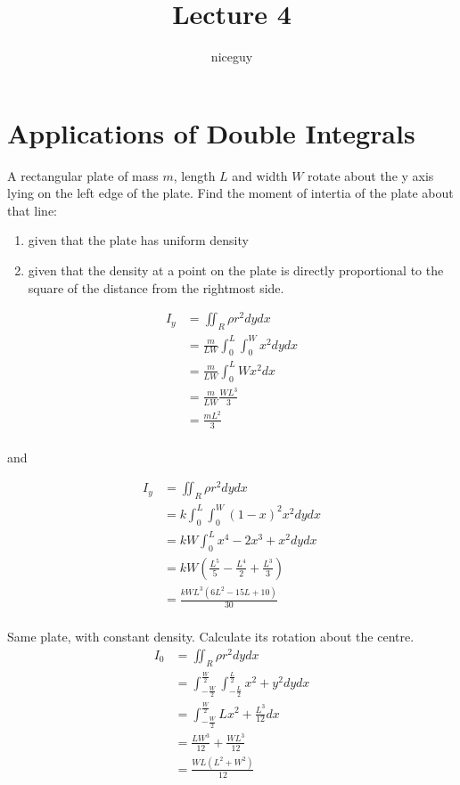 \documentclass[12pt]{article}
\author{niceguy}
\title{Lecture 4}
\begin{document}
\maketitle

\section{Applications of Double Integrals}

\begin{ex}
	A rectangular plate of mass $m$, length $L$ and width $W$ rotate about the y axis lying on the left edge of the plate. Find the moment of intertia of the plate about that line: \\
	\begin{enumerate}
		\item given that the plate has uniform density \\
		\item given that the density at a point on the plate is directly proportional to the square of the distance from the rightmost side.
	\end{enumerate}
	\begin{align*}
		I_y &= \iint_R \rho r^2 dydx \\
		    &= \frac{m}{LW} \int_0^L \int_0^W x^2 dydx \\
		    &= \frac{m}{LW} \int_0^L Wx^2 dx \\
		    &= \frac{m}{LW} \frac{WL^3}{3} \\
		    &= \frac{mL^2}{3} \\
	\end{align*}

	and

	\begin{align*}
		I_y &= \iint_R \rho r^2 dydx \\
		      &= k \int_0^L \int_0^W (1-x)^2x^2 dydx \\
		      &= kW \int_0^L x^4 - 2x^3 + x^2 dydx \\
		      &= kW \left(\frac{L^5}{5} - \frac{L^4}{2} + \frac{L^3}{3}\right) \\
		      &= \frac{kWL^3(6L^2 - 15L + 10)}{30} \\
	\end{align*}
\end{ex}

\begin{ex}
	Same plate, with constant density. Calculate its rotation about the centre.
	\begin{align*}
		I_0 &= \iint_R \rho r^2 dydx \\
		    &= \int_{-\frac{W}{2}}^{\frac{W}{2}} \int_{-\frac{L}{2}}^{\frac{L}{2}} x^2 + y^2 dydx \\
		    &= \int_{-\frac{W}{2}}^{\frac{W}{2}} Lx^2 + \frac{L^3}{12} dx \\
		    &= \frac{LW^3}{12} + \frac{WL^3}{12} \\
		    &= \frac{WL(L^2 + W^2)}{12} \\
	\end{align*}
\end{ex}
\end{document}
